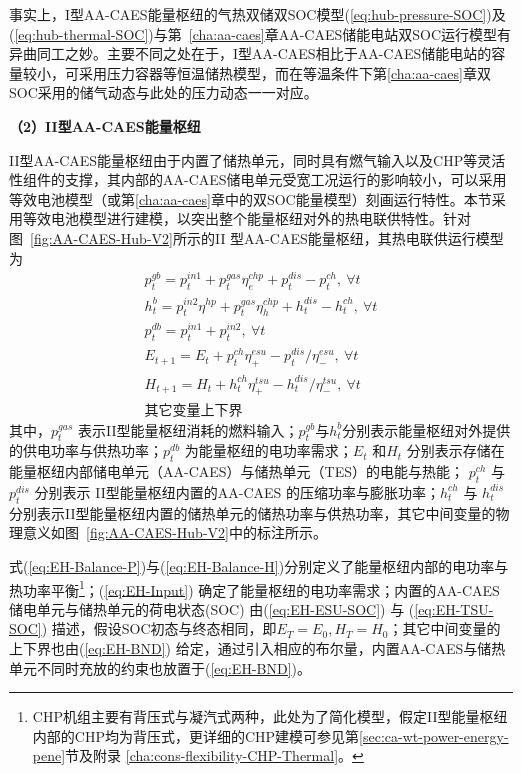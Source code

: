 事实上，I型AA-CAES能量枢纽的气热双储双SOC模型(\ref{eq:hub-pressure-SOC})及(\ref{eq:hub-thermal-SOC})与第~\ref{cha:aa-caes}章AA-CAES储能电站双SOC运行模型有异曲同工之妙。主要不同之处在于，I型AA-CAES相比于AA-CAES储能电站的容量较小，可采用压力容器等恒温储热模型，而在等温条件下第\ref{cha:aa-caes}章双SOC采用的储气动态与此处的压力动态一一对应。

\textbf{（2）II型AA-CAES能量枢纽}

II型AA-CAES能量枢纽由于内置了储热单元，同时具有燃气输入以及CHP等灵活性组件的支撑，其内部的AA-CAES储电单元受宽工况运行的影响较小，可以采用等效电池模型（或第\ref{cha:aa-caes}章中的双SOC能量模型）刻画运行特性。本节采用等效电池模型进行建模，以突出整个能量枢纽对外的热电联供特性。针对图~\ref{fig:AA-CAES-Hub-V2}所示的II 型AA-CAES能量枢纽，其热电联供运行模型为
\begin{subequations}
\label{eq:EH-Cons-II}
\begin{gather}
p_t^{gb} = p_t^{in1} + p_t^{gas} \eta^{chp}_e + p_t^{dis} - p_t^{ch},~ \forall t  \label{eq:EH-Balance-P} \\
h_t^{b} = p_t^{in2} \eta^{hp} + p_t^{gas} \eta^{chp}_h + h_t^{dis} - h_t^{ch},~ \forall t  \label{eq:EH-Balance-H} \\
p_t^{db} = p_t^{in1} + p_t^{in2},~ \forall t  \label{eq:EH-Input} \\
E_{t+1} = E_t + p_t^{ch} \eta^{esu}_+ - p_t^{dis}/\eta^{esu}_-,~\forall t \label{eq:EH-ESU-SOC} \\
H_{t+1} = H_t + h_t^{ch} \eta^{tsu}_+ - h_t^{dis}/\eta^{tsu}_-,~ \forall t \label{eq:EH-TSU-SOC} \\
\mbox{其它变量上下界}   \label{eq:EH-BND}
\end{gather}
\end{subequations}
其中，$p_t^{gas}$ 表示II型能量枢纽消耗的燃料输入；$p_t^{gb}$与$h_t^b$分别表示能量枢纽对外提供的供电功率与供热功率；$p_t^{db}$ 为能量枢纽的电功率需求；$E_t$ 和$H_t$ 分别表示存储在能量枢纽内部储电单元（AA-CAES）与储热单元（TES）的电能与热能； $p_t^{ch}$ 与 $p_t^{dis}$ 分别表示 II型能量枢纽内置的AA-CAES 的压缩功率与膨胀功率；$h_t^{ch}$ 与 $h_t^{dis}$分别表示II型能量枢纽内置的储热单元的储热功率与供热功率，其它中间变量的物理意义如图~\ref{fig:AA-CAES-Hub-V2}中的标注所示。

式(\ref{eq:EH-Balance-P})与(\ref{eq:EH-Balance-H})分别定义了能量枢纽内部的电功率与热功率平衡\footnote{CHP机组主要有背压式与凝汽式两种，此处为了简化模型，假定II型能量枢纽内部的CHP均为背压式，更详细的CHP建模可参见第\ref{sec:ca-wt-power-energy-pene}节及附录
\ref{cha:cons-flexibility-CHP-Thermal}。}；(\ref{eq:EH-Input}) 确定了能量枢纽的电功率需求；内置的AA-CAES 储电单元与储热单元的荷电状态(SOC) 由(\ref{eq:EH-ESU-SOC}) 与 (\ref{eq:EH-TSU-SOC}) 描述，假设SOC初态与终态相同，即$E_{T} = E_{0}, H_{T} = H_{0}$；其它中间变量的上下界也由(\ref{eq:EH-BND}) 给定，通过引入相应的布尔量，内置AA-CAES与储热单元不同时充放的约束也放置于(\ref{eq:EH-BND})。

